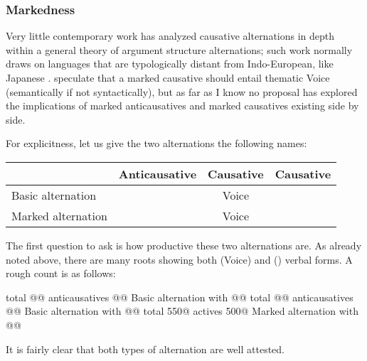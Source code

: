 		\subsubsection{Markedness}
Very little contemporary work has analyzed causative alternations in depth within a general theory of argument structure alternations; such work normally draws on languages that are typologically distant from Indo-European, like Japanese \citep{jacobsen92}. \citet[62f3]{layering15} speculate that a marked causative should entail thematic Voice (semantically if not syntactically), but as far as I know no proposal has explored the implications of marked anticausatives and marked causatives existing side by side.

For explicitness, let us give the two alternations the following names:
\ex
\begin{tabular}{l|ccc}
	&	Anticausative & Causative & Causative\\\hline
Basic alternation	& {\vz} & Voice &   \\
Marked alternation		&		&  Voice & {\vd}\\
\end{tabular}
\xe

The first question to ask is how productive these two alternations are. As already noted above, there are many roots showing both {\tkal} (Voice) and {\thif} (\vd) verbal forms. A rough count is as follows:

{\tnif} total @@
	{\tnif} anticausatives @@
		Basic alternation with {\tkal} @@
{\thit} total @@
	{\thit} anticausatives @@
		Basic alternation with {\tpie} @@
{\thif} total 550@
	{\thif} actives 500@
		Marked alternation with {\tkal} @@

It is fairly clear that both types of alternation are well attested.

